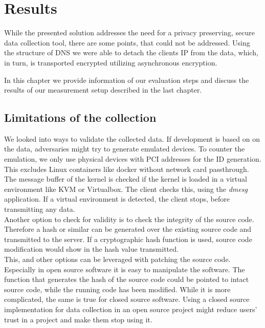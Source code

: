 \chapter{Results}
\label{chap:results}

While the presented solution addresses the need for a privacy preserving, secure data collection tool, there are some points, that could not be addressed. 
Using the structure of DNS we were able to detach the clients IP from the data, which, in turn, is transported encrypted utilizing asynchronous encryption. 

In this chapter we provide information of our evaluation steps and discuss the results of our measurement setup described in the last chapter.\\

\section{Limitations of the collection}
\label{sec:measurement:robust}
%

    We looked into ways to validate the collected data. If development is based on on the data, adversaries might try to generate emulated devices. To counter the emulation, we only use physical devices with PCI addresses for the ID generation. This excludes Linux containers like docker without network card passthrough. The message buffer of the kernel is checked if the kernel is loaded in a virtual environment like KVM or Virtualbox. The client checks this, using the \textit{dmesg} application. 
    If a virtual environment is detected, the client stops, before transmitting any data.\\
    
    Another option to check for validity is to check the integrity of the source code. Therefore a hash or similar can be generated over the existing source code and transmitted to the server.
    If a cryptographic hash function is used, source code modification would show in the hash value transmitted.\\
    This, and other options can be leveraged with patching the source code. Especially in open source software it is easy to manipulate the software. The function that generates the hash of the source code could be pointed to intact source code, while the running code has been modified. While it is more complicated, the same is true for closed source software.
    Using a closed source implementation for data collection in an open source project might reduce users' trust in a project and make them stop using it.
    



